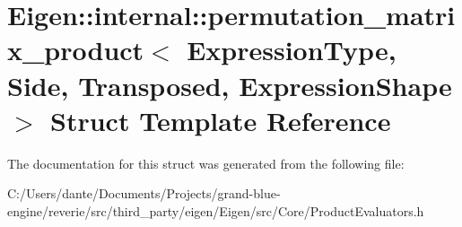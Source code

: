 \hypertarget{struct_eigen_1_1internal_1_1permutation__matrix__product}{}\section{Eigen\+::internal\+::permutation\+\_\+matrix\+\_\+product$<$ Expression\+Type, Side, Transposed, Expression\+Shape $>$ Struct Template Reference}
\label{struct_eigen_1_1internal_1_1permutation__matrix__product}


The documentation for this struct was generated from the following file\+:\begin{DoxyCompactItemize}
\item 
C\+:/\+Users/dante/\+Documents/\+Projects/grand-\/blue-\/engine/reverie/src/third\+\_\+party/eigen/\+Eigen/src/\+Core/Product\+Evaluators.\+h\end{DoxyCompactItemize}

